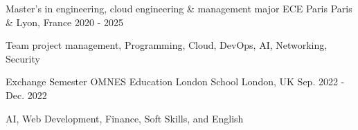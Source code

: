 

\begin{cventries}

    \cventry
    {Master's in engineering, cloud engineering \& management major} %
    {ECE Paris} %
    {Paris \& Lyon, France} %
    {2020 - 2025} %
    {
        \begin{cvitems} %
            \item {
                Team project management, Programming, Cloud, DevOps, AI, Networking, Security
            }
        \end{cvitems}
    }

    \cventry
    {Exchange Semester} %
    {OMNES Education London School} %
    {London, UK} %
    {Sep. 2022 - Dec. 2022} %
    {
        \begin{cvitems} %
            \item {
                AI, Web Development, Finance, Soft Skills, and English
            }
        \end{cvitems}
    }

\end{cventries}
